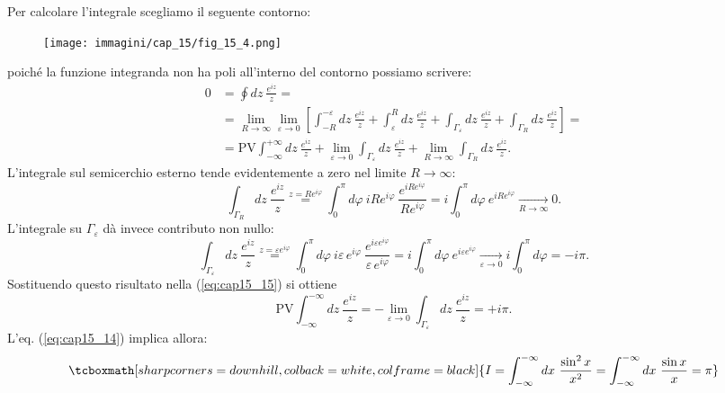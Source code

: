 \documentclass[a4paper,12pt,oneside]{book}
\begin{document}
Per calcolare l'integrale scegliamo il seguente contorno:
\begin{figure}[!htbp]
\begin{center}
\texttt{[image: immagini/cap\_15/fig\_15\_4.png]}
\end{center}
\end{figure}
poiché la funzione integranda non ha poli all'interno del contorno possiamo scrivere:
	\begin{align}
		0 & =  \oint  dz\ \frac{e^{iz}}{z} = \nonumber \\
		&= \lim _{R\rightarrow \infty} \lim _{\varepsilon\rightarrow 0} \left[ \int _{-R} ^{-\varepsilon}dz\ \frac{e^{iz}}{z}+\int _{\varepsilon} ^{R}dz\ \frac{e^{iz}}{z}+\int _{\Gamma _{\varepsilon}} dz\ \frac{e^{iz}}{z} +\int _{\Gamma _{R}} dz\ \frac{e^{iz}}{z}\right] = \nonumber\\
		&= \textrm{PV}\int _{-\infty} ^{+\infty}dz\ \frac{e^{iz}}{z}+ \lim _{\varepsilon\rightarrow 0}  \int _{\Gamma _{\varepsilon}} dz\ \frac{e^{iz}}{z}+\lim _{R\rightarrow \infty}\int _{\Gamma _{R}} dz\ \frac{e^{iz}}{z}.
	\label{eq:cap15_15}
	\end{align}
L'integrale sul semicerchio esterno tende evidentemente a zero nel limite $R\rightarrow \infty $:
	\begin{equation}
		\int _{\Gamma _{R}} dz\ \frac{e^{iz}}{z} \overset{z= Re^{i\varphi}}{=} \int _0 ^{\pi} d\varphi \ i R e^{i\varphi}\ \frac{e^{iRe^{i\varphi}}}{Re^{i\varphi}} = i\int _0 ^{\pi} d\varphi \ e^{iRe^{i\varphi}} \underset{R\rightarrow \infty}{\longrightarrow}0.
	\end{equation}
L'integrale su $\Gamma _{\varepsilon}$ dà invece contributo non nullo:
	\begin{equation}
		\int _{\Gamma _{\varepsilon}} dz\ \frac{e^{iz}}{z} \overset{z= \varepsilon e^{i\varphi}}{=} \int _0 ^{\pi} d\varphi \ i \varepsilon\, e^{i\varphi}\ \frac{e^{i\varepsilon  e^{i\varphi}}}{\varepsilon\, e^{i\varphi}} =  i\int _0 ^{\pi} d\varphi \ e^{i\varepsilon e^{i\varphi}} \underset{\varepsilon\rightarrow 0}{\longrightarrow}i\int _0 ^{\pi} d\varphi = -i\pi.
	\end{equation}
Sostituendo questo risultato nella (\ref{eq:cap15_15}) si ottiene
	\begin{equation}
		\textrm{PV} \int _{-\infty} ^{-\infty} dz\ \frac{e^{iz}}{z} =-\lim _{\varepsilon \rightarrow 0} \int _{\Gamma _{\varepsilon}} dz\ \frac{e^{iz}}{z}= +i\pi.
	\end{equation}
L'eq. (\ref{eq:cap15_14}) implica allora:
	\begin{equation}
		\tcboxmath[sharp corners=downhill, colback=white, colframe=black]{
			I= \int _{-\infty} ^{-\infty} dx\ \frac{\sin ^2  x}{x^2}= \int _{-\infty} ^{-\infty} dx\ \frac{\sin  x}{x}= \pi
			}
	\end{equation}
\newpage
\end{document}
